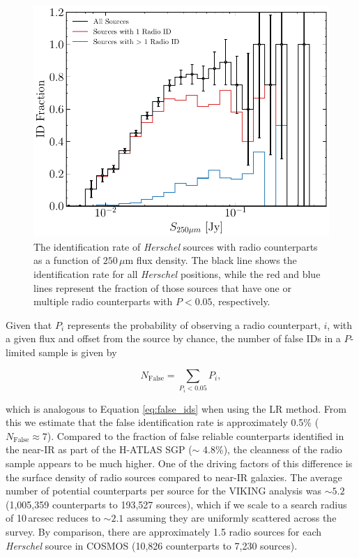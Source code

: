 \begin{figure}
	\centering
	\includegraphics[width=0.75\columnwidth]{Figures/id_fraction_radio.pdf}
	\caption[Identification rate of \textit{Herschel} sources with radio counterparts]{The identification rate of \textit{Herschel} sources with radio counterparts as a function of $250\,\mu$m flux density. The black line shows the identification rate for all \textit{Herschel} positions, while the red and blue lines represent the fraction of those sources that have one or multiple radio counterparts with $P < 0.05$, respectively.}
	\label{fig:id_rate}
\end{figure}

Given that $P_i$ represents the probability of observing a radio counterpart, $i$, with a given flux and offset from the source by chance, the number of false IDs in a $P$-limited sample is given by

\begin{equation}
    N_{\textrm{False}} = \sum_{P_i < 0.05} P_i,
    \label{eq:false_radio_ids}
\end{equation}

\noindent which is analogous to Equation \ref{eq:false_ids} when using the LR method. From this we estimate that the false identification rate is approximately 0.5\% ($N_\textrm{False} \approx 7$). Compared to the fraction of false reliable counterparts identified in the near-IR as part of the H-ATLAS SGP ($\sim$ 4.8\%), the cleanness of the radio sample appears to be much higher. One of the driving factors of this difference is the surface density of radio sources compared to near-IR galaxies. The average number of potential counterparts per source for the VIKING analysis was $\sim 5.2$ (1,005,359 counterparts to 193,527 sources), which if we scale to a search radius of 10\,arcsec reduces to $\sim 2.1$ assuming they are uniformly scattered across the survey. By comparison, there are approximately 1.5 radio sources for each \textit{Herschel} source in COSMOS (10,826 counterparts to 7,230 sources).

